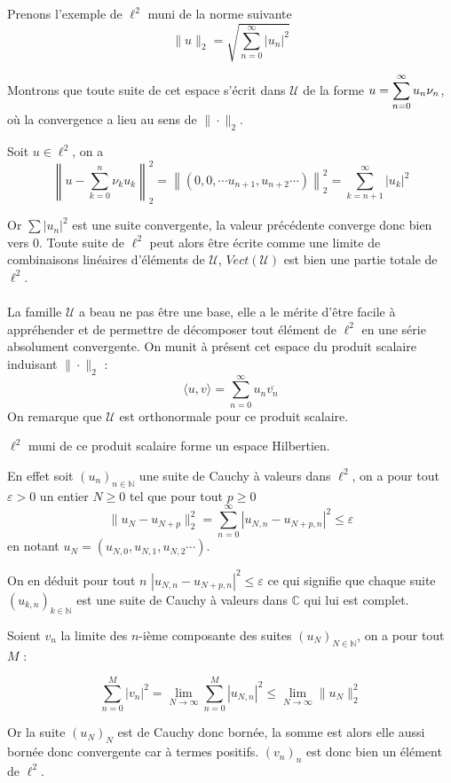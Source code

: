 	\begin{myexmpl}
		Prenons l'exemple de $\ell^2$ muni de la norme suivante $$\|u\|_2 = \sqrt{\sum_{n = 0}^\infty |u_n|^2}$$
		
		Montrons que toute suite de cet espace s'écrit dans $\mathcal{U}$ de la forme $\displaystyle u = \sum_{n = 0}^\infty u_n \nu_n$, où la convergence a lieu au sens de $\|\cdot\|_2$.
		
		Soit $u \in \ell^2$, on a $$\left\|u - \sum_{k = 0}^{n} \nu_k u_k\right\|_2^2 = \left\|(0, 0, \cdots u_{n+1}, u_{n+2} \cdots)\right\|_2^2 = \sum_{k = n+1}^\infty |u_k|^2$$
		
		Or $\sum |u_n|^2$ est une suite convergente, la valeur précédente converge donc bien vers 0. Toute suite de $\ell^2$ peut alors être écrite comme une limite de combinaisons linéaires d'éléments de $\mathcal{U}$, $Vect(\mathcal{U})$ est bien une partie totale de $\ell^2$.
	\end{myexmpl}
	
	\paragraph*{}
	La famille $\mathcal{U}$ a beau ne pas être une base, elle a le mérite d'être facile à appréhender et de permettre de décomposer tout élément de $\ell^2$ en une série absolument convergente. On munit à présent cet espace du produit scalaire induisant $\|\cdot\|_2$ : $$\langle u, v \rangle = \sum_{n = 0}^\infty u_n \overline{v_n}$$
	On remarque que $\mathcal{U}$ est orthonormale pour ce produit scalaire.
	
	\begin{myproposition}
		$\ell^2$ muni de ce produit scalaire forme un espace Hilbertien.
	\end{myproposition}

	\begin{myproof}
		En effet soit $(u_n)_{n \in \mathbb{N}}$ une suite de Cauchy à valeurs dans $\ell^2$, on a pour tout $\varepsilon > 0$ un entier $N \geqslant 0$ tel que pour tout $p \geqslant 0$ $$\|u_N - u_{N+p}\|^2_2 = \sum_{n=0}^{\infty} |u_{N, n} - u_{N+p, n}|^2 \leqslant \varepsilon$$
		en notant $u_N=(u_{N, 0}, u_{N, 1}, u_{N, 2} \cdots)$.
		
		On en déduit pour tout $n$ $|u_{N, n} - u_{N+p, n}|^2 \leqslant \varepsilon$ ce qui signifie que chaque suite $(u_{k, n})_{k \in \mathbb{N}}$ est une suite de Cauchy à valeurs dans $\mathbb{C}$ qui lui est complet.
		
		Soient $v_n$ la limite des $n$-ième composante des suites $(u_N)_{N \in \mathbb{N}}$, on a pour tout $M$ :
		
		$$\sum_{n=0}^{M} |v_n|^2 = \lim\limits_{N \to \infty} \sum_{n=0}^{M} |u_{N, n}|^2 \leqslant \lim\limits_{N\to \infty} \|u_N\|_2^2$$
		
		Or la suite $(u_N)_N$ est de Cauchy donc bornée, la somme est alors elle aussi bornée donc convergente car à termes positifs. $(v_n)_n$ est donc bien un élément de $\ell^2$.
		
		\cqfd
	\end{myproof}
	
